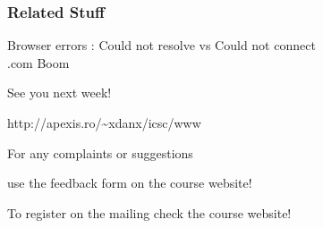\documentclass{beamer}
\begin{document}
\begin{frame}
\frametitle{Related Stuff}
Browser errors : \alert{Could not resolve} vs \alert{Could not connect}\\
\vspace{0.5cm}
.com Boom
\end{frame}


\begin{frame}
\centerline{See you next week!}
\centerline{http://apexis.ro/\textasciitilde xdanx/icsc/www}
\vspace{0.5cm} 
\centerline{For any complaints or suggestions}
\centerline{use the feedback form on the course website!}
\vspace{0.5cm}
\centerline{To register on the mailing check the course website!}
\vspace{0.5cm}
\end{frame}


\end{document}

